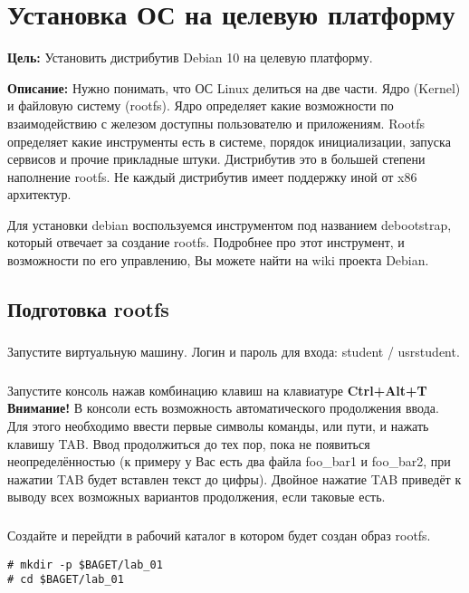 \chapter{Установка ОС на целевую платформу}
\textbf{Цель:} Установить дистрибутив Debian 10 на целевую платформу.

\textbf{Описание:} Нужно понимать, что ОС Linux делиться на две части. Ядро (Kernel) и файловую систему (rootfs). Ядро определяет какие возможности по взаимодействию с железом доступны пользователю и приложениям. Rootfs определяет какие инструменты есть в системе, порядок инициализации, запуска сервисов и прочие прикладные штуки. Дистрибутив это в большей степени наполнение rootfs. Не каждый дистрибутив имеет поддержку иной от x86 архитектур.

Для установки debian воспользуемся инструментом под названием debootstrap, который отвечает за создание rootfs. Подробнее про этот инструмент, и возможности по его управлению, Вы можете найти на wiki проекта Debian.
\section{Подготовка rootfs}

\subsection{}Запустите виртуальную машину. Логин и пароль для входа: student / usrstudent.

\subsection{} Запустите консоль нажав комбинацию клавиш на клавиатуре \textbf{Ctrl+Alt+T} \\

\textbf{Внимание!} В консоли есть возможность автоматического продолжения ввода. Для этого необходимо ввести первые символы команды, или пути, и нажать клавишу TAB. Ввод продолжиться до тех пор, пока не появиться неопределённостью (к примеру у Вас есть два файла foo\_bar1 и foo\_bar2, при нажатии TAB будет вставлен текст до цифры). Двойное нажатие TAB приведёт к выводу всех возможных вариантов продолжения, если таковые есть.

\subsection{}Создайте и перейдти в рабочий каталог в котором будет создан образ rootfs.
\begin{lstlisting}
# mkdir -p $BAGET/lab_01
# cd $BAGET/lab_01 
\end{lstlisting}

